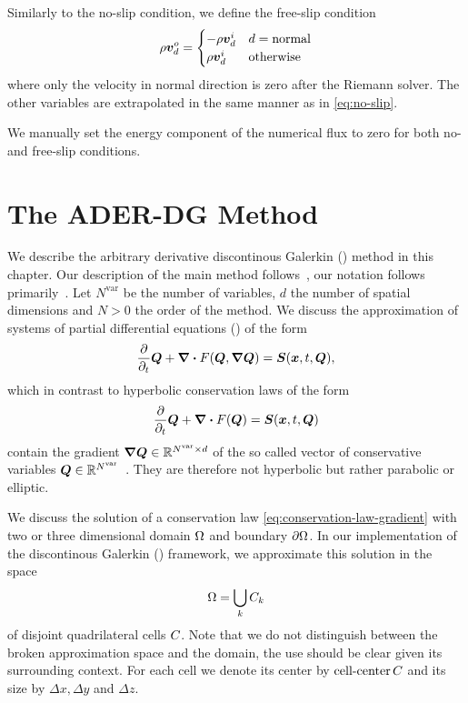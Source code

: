 Similarly to the no-slip condition, we define the free-slip condition
\begin{equation}
  \label{eq:free-slip}
  \Qj^o_d = \begin{cases}
    -\Qj^i_d & d = \text{normal} \\
    \Qj^i_d & \text{otherwise}
    \end{cases}
\end{equation}
where only the velocity in normal direction is zero after the Riemann solver.
The other variables are extrapolated in the same manner as in \cref{eq:no-slip}.

We manually set the energy component of the numerical flux to zero for both no- and free-slip conditions.
\section{The ADER-DG Method}\label{sec:ader-dg}
\newcommand{\NVar}{N^{\text{var}}}
\newcommand{\dimensions}{d}
\newcommand{\mapping}{\mathcal{M}}
\newcommand{\volume}{V}
\newcommand{\cellCenter}{\operatorname{cell-center}}
We describe the arbitrary derivative discontinous Galerkin (\aderdg) method in this chapter.
Our description of the main method follows~\cite{dumbser2008unified,dumbser2010arbitrary,dumbser2018efficient}, our notation follows primarily~\cite{dumbser2018efficient}.
Let $\NVar$ be the number of variables, $\dimensions$ the number of spatial dimensions and $N > 0$ the order of the method.
We discuss the approximation of systems of partial differential equations (\pde) of the form
\begin{equation}
  \label{eq:conservation-law-gradient}
 \frac{\partial}{\partial_t}  \Q + \div \flux(\Q, \gradQ) = \source(\bm{x}, t, \Q),
\end{equation}
which in contrast to hyperbolic conservation laws of the form
\begin{equation}
  \label{eq:conservation-law}
 \frac{\partial}{\partial_t}  \Q + \div \flux(\Q) = \source(\bm{x}, t, \Q)
\end{equation}
contain the gradient $\gradQ \in \mathbb{R}^{\NVar \times \dimensions}$ of the so called vector of conservative variables $\Q \in \mathbb{R}^{\NVar}$~\cite{dumbser2010arbitrary}.
They are therefore not hyperbolic but rather parabolic or elliptic.

We discuss the solution of a conservation law \cref{eq:conservation-law-gradient} with two or three dimensional domain $\Omega$ and boundary $\partial \Omega$.
In our implementation of the discontinous Galerkin (\dg) framework, we approximate this solution in the space
\begin{equation}
  \label{eq:dg-space}
  \broken = \bigcup_k \cell[k]
\end{equation}
of disjoint quadrilateral cells $C_{}$.
Note that we do not distinguish between the broken approximation space and the domain, the use should be clear given its surrounding context.
For each cell we denote its center by $\cellCenter{\cell}$ and its size by $\Delta x, \Delta y$ and $\Delta z$.

